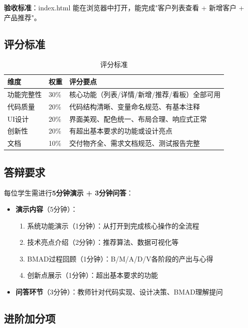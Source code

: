 \textbf{验收标准}：index.html 能在浏览器中打开，能完成"客户列表查看 + 新增客户 + 产品推荐"。

\subsection{评分标准}

\begin{table}[H]
\centering
\begin{tabular}{llp{6cm}}
\toprule
\textbf{维度} & \textbf{权重} & \textbf{评分要点} \\
\midrule
功能完整性 & 30\% & 核心功能（列表/详情/新增/推荐/看板）全部可用 \\
代码质量 & 20\% & 代码结构清晰、变量命名规范、有基本注释 \\
UI设计 & 20\% & 界面美观、配色统一、布局合理、响应式正常 \\
创新性 & 20\% & 有超出基本要求的功能或设计亮点 \\
文档 & 10\% & 交付物齐全、需求文档规范、测试报告完整 \\
\bottomrule
\end{tabular}
\caption{评分标准}
\end{table}

\subsection{答辩要求}

每位学生需进行\textbf{5分钟演示 + 3分钟问答}：

\begin{itemize}[leftmargin=2em]
  \item \textbf{演示内容}（5分钟）：
  \begin{enumerate}[leftmargin=2em]
    \item 系统功能演示（1分钟）：从打开到完成核心操作的全流程
    \item 技术亮点介绍（2分钟）：推荐算法、数据可视化等
    \item BMAD过程回顾（1分钟）：B/M/A/D/V各阶段的产出与心得
    \item 创新点展示（1分钟）：超出基本要求的功能
  \end{enumerate}
  \item \textbf{问答环节}（3分钟）：教师针对代码实现、设计决策、BMAD理解提问
\end{itemize}

\subsection{进阶加分项}

